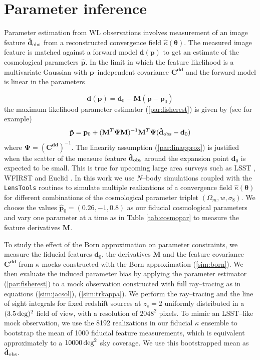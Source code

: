 \documentclass[reprint,aps,prd,superscriptaddress,showkeys,showpacs]{revtex4-1}
\newcommand{\bb}[1]{\mathbf{#1}}
\newcommand{\bbh}[1]{\mathbf{\hat{#1}}}
\newcommand{\h}[1]{\hat{#1}}
\newcommand{\ttt}[1]{\texttt{#1}}
\newcommand\pt{\pmb{\theta}}
\begin{document}
\section{Parameter inference}
% 
Parameter estimation from WL observations involves measurement of an image feature $\bbh{d}_{\rm obs}$ from a reconstructed convergence field $\h{\kappa}(\pt)$. The measured image feature is matched against a forward model $\bb{d}(\bb{p})$ to get an estimate of the cosmological parameters $\bbh{p}$. In the limit in which the feature likelihood is a multivariate Gaussian with $\bb{p}$--independent covariance $\bb{C}^{\bb{d}\bb{d}}$ and the forward model is linear in the parameters 

\begin{equation}
\label{par:linapprox}
\bb{d}(\bb{p}) = \bb{d}_0 + \bb{M}(\bb{p}-\bb{p}_0)
\end{equation}
%
the maximum likelihood parameter estimator (\ref{par:fisherest}) is given by (see \citep{DodelsonSchneider13,PetriVariance} for example)
\begin{equation}
\label{par:fisherest}
\bbh{p} = \bb{p}_0 + (\bb{M}^T\bb{\Psi M})^{-1} \bb{M}^T\bb{\Psi} (\bbh{d}_{\rm obs}-\bb{d}_0)
\end{equation}
%
where $\bb{\Psi}=(\bb{C}^{\bb{d}\bb{d}})^{-1}$. The linearity assumption (\ref{par:linapprox}) is justified when the scatter of the measure feature $\bbh{d}_{\rm obs}$ around the expansion point $\bb{d}_0$ is expected to be small. This is true for upcoming large area surveys such as LSST \citep{LSST}, WFIRST \citep{WFIRST} and Euclid \citep{Euclid}. In this work we use $N$--body simulations coupled with the \ttt{LensTools} routines to simulate multiple realizations of a convergence field $\h{\kappa}(\pt)$ for different combinations of the cosmological parameter triplet $(\Omega_m,w,\sigma_8)$. We choose the values $\bbh{p}_0=(0.26,-1,0.8)$ as our fiducial cosmological parameters and vary one parameter at a time as in Table \ref{tab:cosmopar} to measure the feature derivatives $\bb{M}$. 

To study the effect of the Born approximation on parameter constraints, we measure the fiducial features $\bb{d}_0$, the derivatives $\bb{M}$ and the feature covariance $\bb{C}^{\bb{d}\bb{d}}$ from $\kappa$ mocks constructed with the Born approximation (\ref{sim:born}). We then evaluate the induced parameter bias by applying the parameter estimator (\ref{par:fisherest}) to a mock observation constructed with full ray--tracing as in equations (\ref{sim:jacsol}), (\ref{sim:trkappa}). We perform the ray--tracing and the line of sight integrals for fixed redshift sources at $z_s=2$ uniformly distributed in a $(3.5\,{\rm deg})^2$ field of view, with a resolution of $2048^2$ pixels. To mimic an LSST--like mock observation, we use the 8192 realizations in our fiducial $\kappa$ ensemble to bootstrap the mean of 1000 fiducial feature measurements, which is equivalent approximately to a $10000\,{\rm deg}^2$ sky coverage. We use this bootstrapped mean as $\bbh{d}_{\rm obs}$.   
\end{document}
